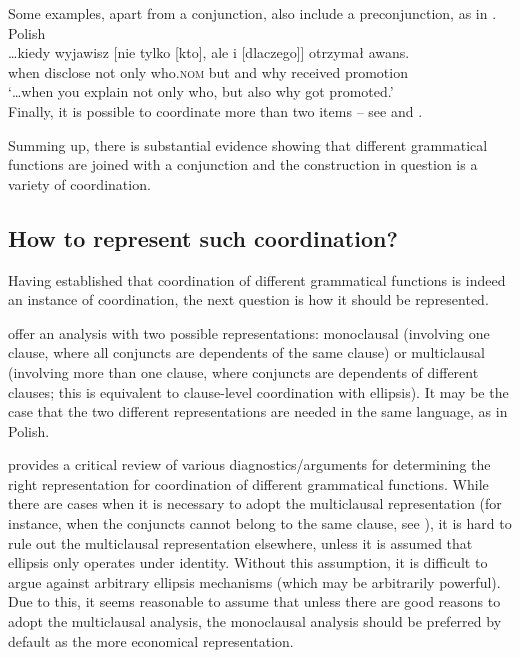 \documentclass[output=paper]{../langscibook}
\begin{document}
\z
Some examples, apart from a conjunction, also include a
preconjunction, as in .
\ea\label{ex:pat:prz:19:syntaxfest:9}
    Polish\\\gll
      …kiedy wyjawisz [nie tylko [kto], ale i [dlaczego]] otrzymał awans. \\
      when disclose \phtm{[}not only \phtm{[}who.\textsc{nom} but and \phtm{[}why received promotion\\
\glt`…when you explain not only who, but also why got promoted.'\\ \hspace*{\fill} \citep[(9)]{pat:prz:19:syntaxfest}
\z
Finally, it is possible to coordinate more than two items – see
 and
.

Summing up, there is substantial evidence showing
that different grammatical functions are joined with a conjunction and the construction
in question is a variety of coordination.

\subsection{How to represent such coordination?}
\label{sec:Coordination:lexsem:repr}

Having established that coordination of different grammatical
functions is indeed an instance of coordination, the next question is
how it should be represented.

\citet{PatejukPrzepiorkowski2012} offer an analysis with two possible
representations: monoclausal (involving one clause, where all
conjuncts are dependents of the same clause) or multiclausal
(involving more than one clause, where conjuncts are dependents of
different clauses; this is equivalent to clause-level coordination
with ellipsis). It may be the case that the two different
representations are needed in the same language, as in Polish.

\citet{Patejuk2015} provides a critical review of various
diagnostics/arguments for determining the right representation for
coordination of different grammatical functions. While there are cases
when it is necessary to adopt the multiclausal representation (for
instance, when the conjuncts cannot belong to the same
clause, see ), it is hard to rule out the multiclausal
representation elsewhere, unless it is assumed that ellipsis only operates under
identity. Without this assumption, it is difficult to argue against
arbitrary ellipsis mechanisms (which may be arbitrarily powerful). Due
to this, it seems reasonable to assume that unless there are good
reasons to adopt the multiclausal analysis, the monoclausal analysis
should be preferred by default as the more economical representation.
\end{document}
